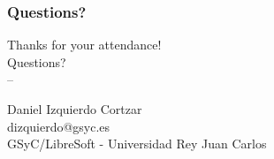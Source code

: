 \documentclass{beamer}
\begin{document}


\begin{frame}
\frametitle{Questions?}
\begin{center}
Thanks for your attendance!\\
Questions?\\
--\\
\begin{small}
Daniel Izquierdo Cortzar\\
dizquierdo@gsyc.es\\
GSyC/LibreSoft - Universidad Rey Juan Carlos\\
\end{small}
\end{center}
\end{frame}
\end{document}
